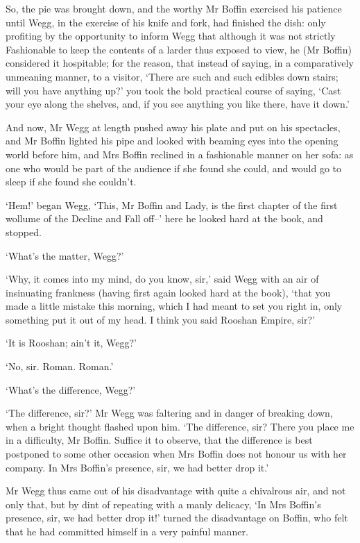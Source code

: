 So, the pie was brought down, and the worthy Mr Boffin exercised his
patience until Wegg, in the exercise of his knife and fork, had finished
the dish: only profiting by the opportunity to inform Wegg that although
it was not strictly Fashionable to keep the contents of a larder thus
exposed to view, he (Mr Boffin) considered it hospitable; for the
reason, that instead of saying, in a comparatively unmeaning manner, to
a visitor, ‘There are such and such edibles down stairs; will you have
anything up?’ you took the bold practical course of saying, ‘Cast your
eye along the shelves, and, if you see anything you like there, have it
down.’

And now, Mr Wegg at length pushed away his plate and put on his
spectacles, and Mr Boffin lighted his pipe and looked with beaming
eyes into the opening world before him, and Mrs Boffin reclined in a
fashionable manner on her sofa: as one who would be part of the audience
if she found she could, and would go to sleep if she found she couldn’t.

‘Hem!’ began Wegg, ‘This, Mr Boffin and Lady, is the first chapter of
the first wollume of the Decline and Fall off--’ here he looked hard at
the book, and stopped.

‘What’s the matter, Wegg?’

‘Why, it comes into my mind, do you know, sir,’ said Wegg with an air
of insinuating frankness (having first again looked hard at the book),
‘that you made a little mistake this morning, which I had meant to set
you right in, only something put it out of my head. I think you said
Rooshan Empire, sir?’

‘It is Rooshan; ain’t it, Wegg?’

‘No, sir. Roman. Roman.’

‘What’s the difference, Wegg?’

‘The difference, sir?’ Mr Wegg was faltering and in danger of breaking
down, when a bright thought flashed upon him. ‘The difference, sir?
There you place me in a difficulty, Mr Boffin. Suffice it to observe,
that the difference is best postponed to some other occasion when Mrs
Boffin does not honour us with her company. In Mrs Boffin’s presence,
sir, we had better drop it.’

Mr Wegg thus came out of his disadvantage with quite a chivalrous air,
and not only that, but by dint of repeating with a manly delicacy,
‘In Mrs Boffin’s presence, sir, we had better drop it!’ turned the
disadvantage on Boffin, who felt that he had committed himself in a very
painful manner.


